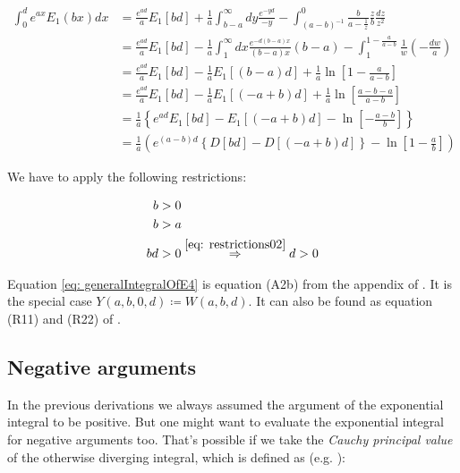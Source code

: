 \documentclass[bibliography=totocnumbered]{scrartcl}
\begin{document}
	\begin{align}
		\int_{0}^{d}e^{ax}E_1\left(bx\right)dx&=\frac{e^{ad}}{a}E_1\left[bd\right]+\frac{1}{a}\int_{b-a}^{\infty}dy\frac{e^{-yd}}{-y}-\int_{\left(a-b\right)^{-1}}^{0}\frac{b}{a-\frac{1}{z}}\frac{z}{b}\frac{dz}{z^2}\\
		&=\frac{e^{ad}}{a}E_1\left[bd\right]-\frac{1}{a}\int_{1}^{\infty}dx\frac{e^{-d\left(b-a\right)x}}{\left(b-a\right)x}\left(b-a\right)-\int_{1}^{1-\frac{a}{a-b}}\frac{1}{w}\left(-\frac{dw}{a}\right)\\
		&=\frac{e^{ad}}{a}E_1\left[bd\right]-\frac{1}{a}E_1\left[\left(b-a\right)d\right]+\frac{1}{a}\ln{\left[1-\frac{a}{a-b}\right]}\\
		&=\frac{e^{ad}}{a}E_1\left[bd\right]-\frac{1}{a}E_1\left[\left(-a+b\right)d\right]+\frac{1}{a}\ln{\left[\frac{a-b-a}{a-b}\right]}\\
		&=\frac{1}{a}\left\{e^{ad}E_1\left[bd\right]-E_1\left[\left(-a+b\right)d\right]-\ln{\left[-\frac{a-b}{b}\right]}\right\}\\
		&=\frac{1}{a}\left(e^{\left(a-b\right)d}\left\{D\left[bd\right]-D\left[\left(-a+b\right)d\right]\right\}-\ln{\left[1-\frac{a}{b}\right]}\right)\label{eq: generalIntegralOfE4}
	\end{align}

	We have to apply the following restrictions:

	\begin{subequations}
		\begin{align}
			b&>0\label{eq: restrictions01}\\
			b&>a\label{eq: restrictions02}\\
			bd&>0\overset{\eqref{eq: restrictions02}}{\Rightarrow}d>0
		\end{align}
	\end{subequations}

	Equation \eqref{eq: generalIntegralOfE4} is equation (A2b) from the appendix of \cite{boer1990calc}. It is the special case $Y\left(a,b,0,d\right)\coloneqq{}W\left(a,b,d\right)$. It can also be found as equation (R11) and (R22) of \cite{sherman}.

	\subsection{Negative arguments}

	In the previous derivations we always assumed the argument of the exponential integral to be positive. But one might want to evaluate the exponential integral for negative arguments too. That's possible if we take the \emph{Cauchy principal value} of the otherwise diverging integral, which is defined as (e.g. \cite{bronstein}):
\end{document}
